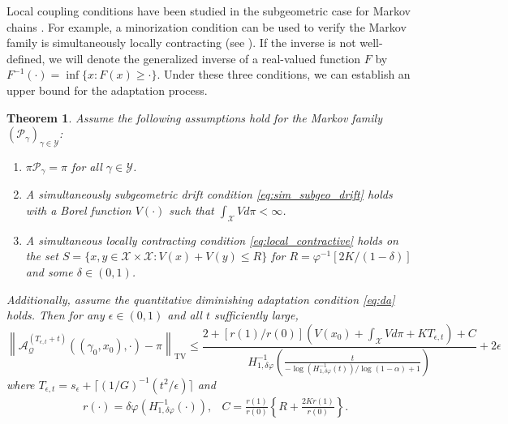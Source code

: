 \documentclass[12pt]{article}
\theoremstyle{plain}
\newtheorem{theorem}{Theorem}
\theoremstyle{remark}
\newcommand{\norm}[1]{\left\lVert#1\right\rVert}
\newcommand{\e}{\epsilon}
\newcommand{\Q}{\mathcal{Q}}
\renewcommand{\P}{\mathcal{P}}
\newcommand{\A}{\mathcal{A}}
\newcommand{\X}{\mathcal{X}}
\newcommand{\Y}{\mathcal{Y}}
\let\temp\phi
\let\phi\varphi
\let\varphi\temp
\newcommand{\eq}[1]{\begin{align*}#1\end{align*}}
\begin{document}
Local coupling conditions have been studied in the subgeometric case for Markov chains \citep{durmus:etal:2016}.
For example, a minorization condition can be used to verify the Markov family is simultaneously locally contracting (see \citep{roberts:rosenthal:2007}).
If the inverse is not well-defined, we will denote the generalized inverse of a real-valued function $F$ by $F^{-1}(\cdot) = \inf\{ x : F(x) \ge \cdot \}$.
Under these three conditions, we can establish an upper bound for the adaptation process. 

\begin{theorem}
\label{theorem:adapt_ub}
Assume the following assumptions hold for the Markov family $(\P_\gamma)_{\gamma \in \Y}$:
\begin{enumerate}
\item $\pi \P_\gamma = \pi$ for all $\gamma \in \Y$.

\item A simultaneously subgeometric drift condition \eqref{eq:sim_subgeo_drift} holds with a Borel function $V(\cdot)$ such that $\int_{\X} V d\pi < \infty$.

\item A simultaneous locally contracting condition \eqref{eq:local_contractive} holds on the set $S = \{ x, y \in \X \times \X : V(x) + V(y) \le R \}$ for $R = \phi^{-1}[ 2K/(1 - \delta) ]$ and some $\delta \in (0, 1)$.
\end{enumerate}
Additionally, assume the quantitative diminishing adaptation condition \eqref{eq:da} holds.
Then for any $\e \in (0, 1)$ and all $t$ sufficiently large,
\[
\norm{ \A_{\Q}^{(T_{\e, t} + t)}((\gamma_0, x_0), \cdot) - \pi }_{\text{TV}}
\le \frac{ 2 + \left[ r(1)/ r(0) \right] \left( V(x_0) + \int_{\X} V d\pi + K T_{\e, t} \right) + C}{ H_{1, \delta \phi}^{-1}\left( \frac{t}{ -\log( H_{1, \delta \phi}^{-1}(t) )/\log(1-\alpha) + 1} \right) } + 2 \e
\]
where $T_{\e, t} = s_{\e} + \lceil (1/G)^{-1}( t^2 / \e ) \rceil$ and
\eq{
&r(\cdot) = \delta \phi(H_{1, \delta \phi}^{-1}(\cdot)),
&C = \frac{r(1)}{r(0)}  \left\{ R + \frac{2 K r(1)}{r(0)} \right\}.
}
\end{theorem}
\end{document}
